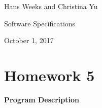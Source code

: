 \documentclass{article}
\begin{document}
\hfill Hans Weeks and Christina Yu

\hfill Software Specifications

\hfill October 1, 2017
\section*{Homework 5}
\textbf{Program Description}\\
\end{document}
